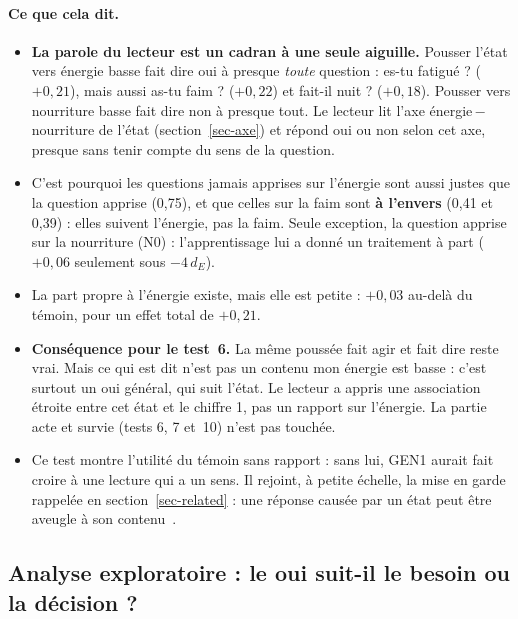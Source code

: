 \documentclass[11pt,a4paper]{article}
\newcommand{\dE}{d_{E}}
\begin{document}
\paragraph{Ce que cela dit.}
\begin{itemize}
\item \textbf{La parole du lecteur est un cadran à une seule aiguille.} Pousser l'état
vers \og énergie basse \fg{} fait dire \og oui \fg{} à presque \emph{toute} question :
\og es-tu fatigué ? \fg{} ($+0,21$), mais aussi \og as-tu faim ? \fg{} ($+0,22$) et
\og fait-il nuit ? \fg{} ($+0,18$). Pousser vers \og nourriture basse \fg{} fait dire
\og non \fg{} à presque tout. Le lecteur lit l'axe énergie\,$-$\,nourriture de l'état
(section~\ref{sec-axe}) et répond \og oui \fg{} ou \og non \fg{} selon cet axe,
presque sans tenir compte du sens de la question.
\item C'est pourquoi les questions jamais apprises sur l'énergie sont aussi justes que
la question apprise (0,75), et que celles sur la faim sont \textbf{à l'envers} (0,41
et 0,39) : elles suivent l'énergie, pas la faim. Seule exception, la question apprise
sur la nourriture (N0) : l'apprentissage lui a donné un traitement à part ($+0,06$
seulement sous $-4\,\dE$).
\item La part propre à l'énergie existe, mais elle est petite : $+0,03$ au-delà du
témoin, pour un effet total de $+0,21$.
\item \textbf{Conséquence pour le test~6.} \og La même poussée fait agir et fait
dire \fg{} reste vrai. Mais ce qui est dit n'est pas un contenu \og mon énergie est
basse \fg{} : c'est surtout un \og oui \fg{} général, qui suit l'état. Le lecteur a
appris une association étroite entre cet état et le chiffre 1, pas un rapport sur
l'énergie. La partie acte et survie (tests 6, 7 et~10) n'est pas touchée.
\item Ce test montre l'utilité du témoin sans rapport : sans lui, GEN1 aurait fait
croire à une lecture qui a un sens. Il rejoint, à petite échelle, la mise en garde
rappelée en section~\ref{sec-related} : une réponse causée par un état peut être
aveugle à son contenu~\cite{realitycheck2026,disturbance2025}.
\end{itemize}

\subsection{Analyse exploratoire : le \og oui \fg{} suit-il le besoin ou la décision ?}
\label{sec-explore-intent}
\end{document}

